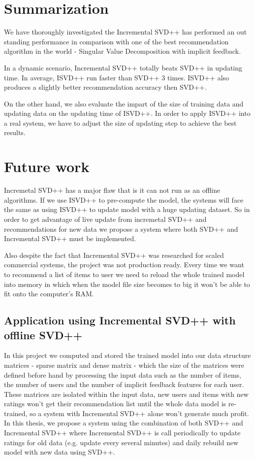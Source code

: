 \documentclass[oneside,13pt]{extreport}
\begin{document}
\section{Summarization}
We have thoroughly investigated the 
Incremental SVD++ has performed an out standing performance in comparison with one of the best recommendation algorithm in the world - Singular Value Decomposition with implicit feedback.

In a dynamic scenario, Incremental SVD++ totally beats SVD++ in updating time. In average, ISVD++ run faster than SVD++ 3 times. ISVD++ also produces a slightly better recommendation accuracy then SVD++.

On the other hand, we also evaluate the impart of the size of training data and updating data on the updating time of ISVD++. In order to apply ISVD++ into a real system, we have to adjust the size of updating step to achieve the best results.
 
\section{Future work}
\label{future_work}
Incremetal SVD++ has a major flaw that is it can not run as an offline algorithms. If we use ISVD++ to pre-compute the model, the systems will face the same  as using ISVD++ to update model with a huge updating dataset.  So in order to get advantage of live update from incremetal SVD++ and recommendations for new data we propose a system where both SVD++ and Incremental SVD++ must be implemented.

Also despite the fact that Incremental SVD++ was researched for scaled commercial systems, the project was not production ready. Every time we want to recommend a list of items to user we need to reload the whole trained model into memory in which when the model file size becomes to big it won't be able to fit onto the computer's RAM.

\subsection{Application using Incremental SVD++ with offline SVD++}

In this project we computed and stored the trained model into our data structure matrices - sparse matrix and dense matrix - which the size of the matrices were defined before hand by processing the input data such as the number of items, the number of users and the number of implicit feedback features for each user. These matrices are isolated within the input data, new users and items with new ratings won't get their recommendation list until the whole data model is re-trained, so a system with Incremental SVD++ alone won't generate much profit. In this thesis, we propose a system using the combination of both SVD++ and Incremental SVD++ where Incremental SVD++ is call periodically to update ratings for old data (e.g. update every several minutes) and daily rebuild new model with new data using SVD++.
\end{document}
